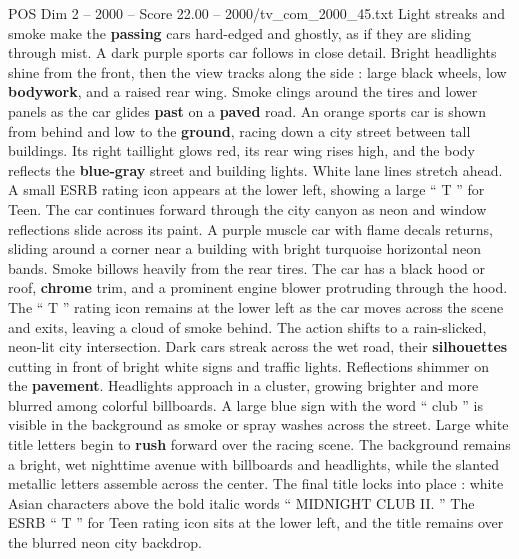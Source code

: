 \begin{textsample}{POS Dim 2 – 2000 – Score 22.00 – 2000/tv\_com\_2000\_45.txt}
Light streaks and smoke make the \textbf{passing} cars hard-edged and ghostly, as if they are sliding through mist.
A dark purple sports car follows in close detail.
Bright headlights shine from the front, then the view tracks along the side : large black wheels, low \textbf{bodywork}, and a raised rear wing.
Smoke clings around the tires and lower panels as the car glides \textbf{past} on a \textbf{paved} road.
An orange sports car is shown from behind and low to the \textbf{ground}, racing down a city street between tall buildings.
Its right taillight glows red, its rear wing rises high, and the body reflects the \textbf{blue-gray} street and building lights.
White lane lines stretch ahead.
A small ESRB rating icon appears at the lower left, showing a large “ T ” for Teen.
The car continues forward through the city canyon as neon and window reflections slide across its paint.
A purple muscle car with flame decals returns, sliding around a corner near a building with bright turquoise horizontal neon bands.
Smoke billows heavily from the rear tires.
The car has a black hood or roof, \textbf{chrome} trim, and a prominent engine blower protruding through the hood.
The “ T ” rating icon remains at the lower left as the car moves across the scene and exits, leaving a cloud of smoke behind.
The action shifts to a rain-slicked, neon-lit city intersection.
Dark cars streak across the wet road, their \textbf{silhouettes} cutting in front of bright white signs and traffic lights.
Reflections shimmer on the \textbf{pavement}.
Headlights approach in a cluster, growing brighter and more blurred among colorful billboards.
A large blue sign with the word “ club ” is visible in the background as smoke or spray washes across the street.
Large white title letters begin to \textbf{rush} forward over the racing scene.
The background remains a bright, wet nighttime avenue with billboards and headlights, while the slanted metallic letters assemble across the center.
The final title locks into place : white Asian characters above the bold italic words “ MIDNIGHT CLUB II. ” The ESRB “ T ” for Teen rating icon sits at the lower left, and the title remains over the blurred neon city backdrop.

\end{textsample}
